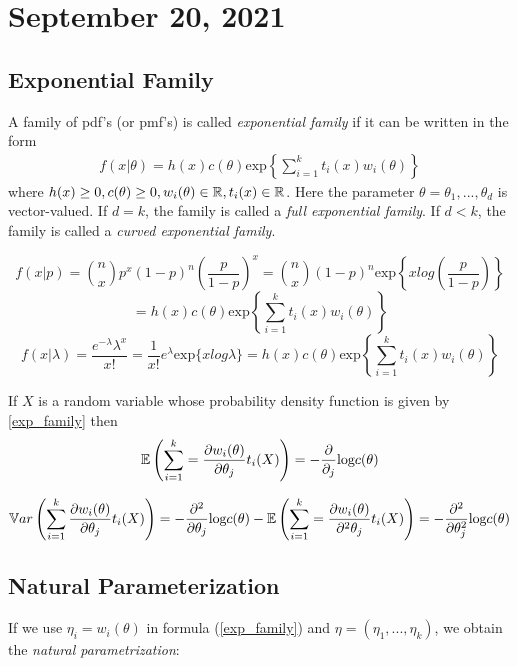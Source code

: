 \section{September 20, 2021}
\subsection{Exponential Family}
A family of pdf's (or pmf's) is called \textit{exponential family} if it can be written in the form
\begin{align}\label{exp_family}
    f(x|\theta) = h(x)c(\theta)\text{exp} \left \{ \sum_{i=1}^kt_i(x)w_i(\theta)\right \}
\end{align}
where $h(x) \geq 0, c(\theta) \geq 0, w_i(\theta) \in \mathbb R, t_i(x) \in \mathbb R$. Here the parameter $\theta = {\theta_1,...,\theta_d}$ is vector-valued. If $d=k$, the family is called a \textit{full exponential family}. If $d < k$, the family is called a \textit{curved exponential family}. 

\begin{note}
    $$f(x|p) = {n \choose x} p^{x}(1-p)^{n} \left ( \frac{p}{1-p}\right )^x = 
    {n \choose x} (1-p)^{n}\text{exp} \left \{ xlog \left( \frac{p}{1-p}\right) \right \}$$
    $$
    =h(x)c(\theta)\text{exp} \left \{ \sum_{i=1}^kt_i(x)w_i(\theta)\right \}
    $$
    $$
    f(x|\lambda) = \frac{e^{-\lambda}\lambda^{x}}{x!}
    =\frac{1}{x!}e^{\lambda}\text{exp}\{xlog\lambda\} =
    h(x)c(\theta)\text{exp} \left \{ \sum_{i=1}^kt_i(x)w_i(\theta)\right \}
    $$
    
\end{note}


\begin{theorem}
If $X$ is a random variable whose probability density function is given by \ref{exp_family} then
$$
\mathbb E \left (
\sum_{i=1}^{k} = \frac{\partial w_i(\theta)}{\partial\theta_j}t_i(X)\right)
= -\frac{\partial}{\partial_j} \text{log} c(\theta)
$$

$$
\mathbb V ar \left (
\sum_{i=1}^{k}  \frac{\partial w_i(\theta)}{\partial\theta_j}t_i(X)\right)
= -\frac{\partial^2}{\partial \theta_j} \text{log} c(\theta) 
- \mathbb E \left (
\sum_{i=1}^{k} = \frac{\partial w_i(\theta)}{\partial^2 \theta_j}t_i(X)\right)
= -\frac{\partial^2}{\partial \theta_j^2} \text{log} c(\theta)$$
\end{theorem}
\subsection{Natural Parameterization}
If we use $\eta_i = w_i(\theta)$ in formula (\ref{exp_family}) and $\eta =(\eta_1,...,\eta_k)$, we obtain the \textit{natural parametrization}:


